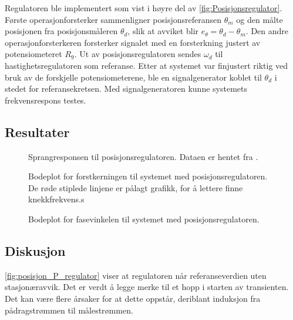 Regulatoren ble implementert som vist i høyre del av \autoref{fig:Posisjonsregulator}. Første operasjonforsterker sammenligner posisjonsreferansen $\theta_m$ og den målte posisjonen fra posisjonsmåleren $\theta_d$, slik at avviket blir $e_{\theta} = \theta_d - \theta_m$. Den andre operasjonforsterkeren forsterker signalet med en forsterkning justert av potensiometeret $R_9$. Ut av posisjonsregulatoren sendes $\omega_d$ til hastighetsregulatoren som referanse.
Etter at systemet var finjustert riktig ved bruk av de forskjelle potensiometerene, ble en signalgenerator koblet til $\theta_d$ i stedet for referansekretsen. Med signalgeneratoren kunne systemets frekvensrespons testes.







\subsection{Resultater}

\begin{figure}[h]
    \centering
    
    \caption{Sprangresponsen til posisjonsregulatoren. Dataen er hentet fra \cite{EksempelData}.}
    \label{fig:posisjon_P_regulator}
\end{figure}

\begin{figure}[h]
    \centering
    
    \caption{Bodeplot for forstkerningen til systemet med posisjonsregulatoren. De røde stiplede linjene er pålagt grafikk, for å lettere finne knekkfrekvens.s}
    \label{fig:bodeplot}
\end{figure}

\begin{figure}[h]
    \centering
    
    \caption{Bodeplot for fasevinkelen til systemet med posisjonsregulatoren.}
    \label{fig:bodeplot_fase}
\end{figure}







\subsection{Diskusjon}

\autoref{fig:posisjon_P_regulator} viser at regulatoren når referanseverdien uten stasjonæravvik. Det er verdt å legge merke til et hopp i starten av transienten. 
Det kan være flere årsaker for at dette oppstår, deriblant induksjon fra pådragstrømmen til målestrømmen.

